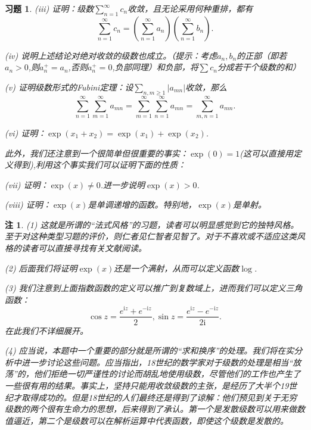 \documentclass{article}
\newtheorem{problem}{习题}[subsection]
\newtheorem{note}{注}[subsection]
\begin{document}
\begin{problem}
(iii) 证明：级数$\sum_{n=1}^\infty c_n$收敛，且无论采用何种重排，都有
$$
\sum_{n=1}^{\infty}{c_n}=\left( \sum_{n=1}^{\infty}{a_n} \right) \left( \sum_{n=1}^{\infty}{b_n} \right) .
$$\par
(iv) 说明上述结论对绝对收敛的级数也成立。（提示：考虑$a_n,b_n$的正部（即若$a_n>0$,则$a_n^+=a_n$,否则$a_n^+=0$,负部同理）和负部，将$\sum c_n$分成若干个级数的和）\par
(v) 证明级数形式的Fubini定理：设$\sum_{n,m\ge 1}|a_{mn}|$收敛，那么
$$
\sum_{n=1}^{\infty}{\sum_{m=1}^{\infty}{a_{mn}}}=\sum_{m=1}^{\infty}{\sum_{n=1}^{\infty}{a_{mn}}}=\sum_{m,n=1}^{\infty}{a_{mn}}.
$$\par
(vi) 证明：$\exp(x_1+x_2)=\exp(x_1)+\exp(x_2)$.\par
此外，我们还注意到一个很简单但很重要的事实：$\exp(0)=1$(这可以直接用定义得到),利用这个事实我们可以证明下面的性质：\par
(vii) 证明：$\exp(x)\ne 0$.进一步说明$\exp(x)>0$.\par
(viii) 证明：$\exp(x)$是单调递增的函数。特别地，$\exp(x)$是单射。
\end{problem}
\begin{note}
(1) 这就是所谓的“法式风格”的习题，读者可以明显感觉到它的独特风格。至于对这种类型习题的评价，则仁者见仁智者见智了。对于不喜欢或不适应这类风格的读者可以直接寻找有关文献阅读。\par
(2) 后面我们将证明$\exp(x)$还是一个满射，从而可以定义函数$\log$.\par
(3) 我们注意到上面指数函数的定义可以推广到复数域上，进而我们可以定义三角函数：
$$
\cos z=\frac{e^{\mathrm{i}z}+e^{-\mathrm{i}z}}{2},\sin z=\frac{e^{\mathrm{i}z}-e^{-\mathrm{i}z}}{2\mathrm{i}}.
$$
在此我们不详细展开。\par
(4) 应当说，本题中一个重要的部分就是所谓的“求和换序”的处理。我们将在实分析中进一步讨论这些问题。应当指出，18世纪的数学家对于级数的处理是相当“放荡”的，他们拒绝一切严谨性的讨论而胡乱地使用级数，尽管他们的工作也产生了一些很有用的结果。事实上，坚持只能用收敛级数的主张，是经历了大半个19世纪才取得成功的。但是18世纪的人们最终还是得到了谅解：他们预见到关于无穷级数的两个很有生命力的思想，后来得到了承认。第一个是发散级数可以用来做数值逼近，第二个是级数可以在解析运算中代表函数，即使这个级数是发散的。
\end{note}
\end{document}
